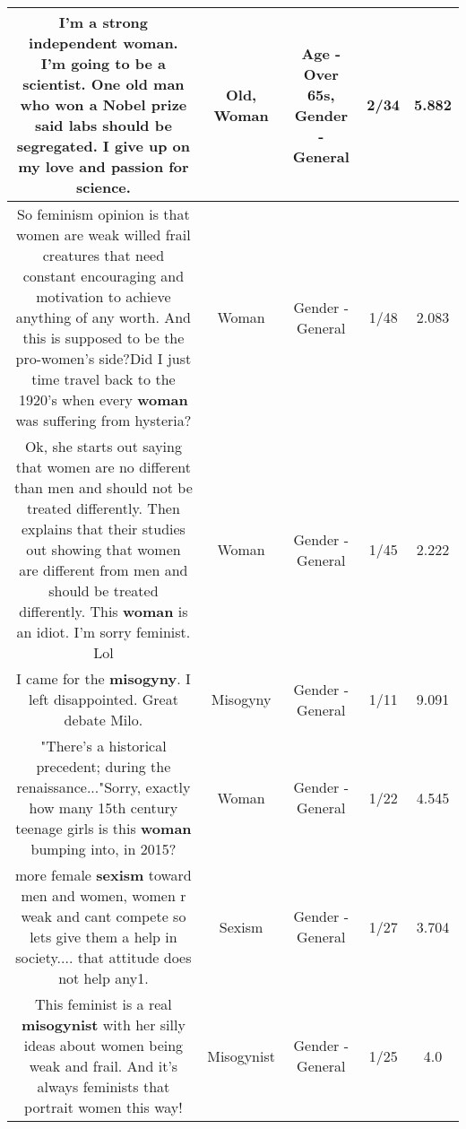 \documentclass[11pt]{article}
\newlength\mylength
\begin{document}
\begin{center}
\begin{longtable}{|C{.65\mylength}|C{.30\mylength}|C{.12\mylength}|C{.12\mylength}|C{.12\mylength}|}
  \small I'm a strong independent \textbf{woman}. I'm going to be a scientist. One \textbf{old} man who won a Nobel prize said labs should be segregated. I give up on my love and passion for science.\normalsize   & Old, Woman & Age - Over 65s, Gender - General & 2/34 & 5.882 \\  \hline
  \small So feminism opinion is that women are weak willed frail creatures that need constant encouraging and motivation to achieve anything of any worth. And this is supposed to be the pro-women's side?Did I just time travel back to the 1920's when every \textbf{woman} was suffering from hysteria?\normalsize   & Woman & Gender - General & 1/48 & 2.083 \\  \hline
  \small Ok, she starts out saying that women are no different than men and should not be treated differently. Then explains that their studies out showing that women are different from men and should be treated differently. This \textbf{woman} is an idiot. I'm sorry feminist. Lol\normalsize   & Woman & Gender - General & 1/45 & 2.222 \\  \hline
  \small I came for the \textbf{misogyny}. I left disappointed. Great debate Milo.\normalsize   & Misogyny & Gender - General & 1/11 & 9.091 \\  \hline
  \small "There's a historical precedent; during the renaissance..."Sorry, exactly how many 15th century teenage girls is this \textbf{woman} bumping into, in 2015?\normalsize   & Woman & Gender - General & 1/22 & 4.545 \\  \hline
  \small more female \textbf{sexism} toward men and women, women r weak and cant compete so lets give them a help in society.... that attitude does not help any1.\normalsize   & Sexism & Gender - General & 1/27 & 3.704 \\  \hline
  \small This feminist is a real \textbf{misogynist} with her silly ideas about women being weak and frail. And it's always feminists that portrait women this way!\normalsize   & Misogynist & Gender - General & 1/25 & 4.0 \\  \hline

\end{longtable}
\end{center}
\end{document}

